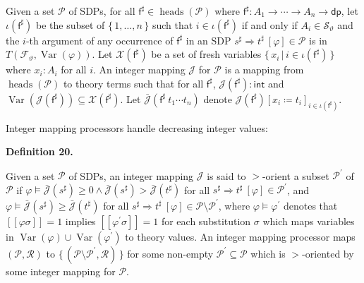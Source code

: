 \documentclass[10pt,a4paper]{amsart}
\providecommand{\coloneq}{\coloneqq}
\begin{document}
Given a set $\mathcal{P}$ of SDPs, for all $\mathsf{f}^{\sharp}\in\operatorname{heads}(\mathcal{P})$ where $\mathsf{f}^{\sharp}:{A}_{1}\rightarrow\cdots\rightarrow{A}_{n}\rightarrow\mathsf{dp}$, let $\iota(\mathsf{f}^{\sharp})$ be the subset of $\{\,1,\ldots,n\,\}$ such that $i\in\iota(\mathsf{f}^{\sharp})$ if and only if $A_{i}\in{\mathcal{S}}_{\vartheta}$ and the $i$-th argument of any occurrence of $\mathsf{f}^{\sharp}$ in an SDP ${s^{\sharp}}\Rightarrow{t^{\sharp}}\ [\varphi]\in\mathcal{P}$ is in $T({\mathcal{F}}_{\vartheta},\operatorname{Var}(\varphi))$. Let $\mathcal{X}(\mathsf{f}^{\sharp})$ be a set of fresh variables $\{\,x_{i}\,|\,i\in\iota(\mathsf{f}^{\sharp})\,\}$ where $x_{i}:A_{i}$ for all $i$. An integer mapping $\mathcal{J}$ for $\mathcal{P}$ is a mapping from $\operatorname{heads}(\mathcal{P})$ to theory terms such that for all $\mathsf{f}^{\sharp}$, $\mathcal{J}(\mathsf{f}^{\sharp}):\mathsf{int}$ and $\operatorname{Var}(\mathcal{J}(\mathsf{f}^{\sharp}))\subseteq\mathcal{X}(\mathsf{f}^{\sharp})$. Let $\bar{\mathcal{J}}({\mathsf{f}^{\sharp}}\ {{t}_{1}\cdots{t}_{n}})$ denote $\mathcal{J}(\mathsf{f}^{\sharp})[{x_{i}}\coloneq{t_{i}}]_{i\in\iota(\mathsf{f}^{\sharp})}$.\par
 
 
 
 
Integer mapping processors handle decreasing integer values:\par
 
 
 
\par\medskip\noindent\textbf{Definition 20.}\par
 
 
Given a set $\mathcal{P}$ of SDPs, an integer mapping $\mathcal{J}$ is said to $>$-orient a subset $\mathcal{P}^{\prime}$ of $\mathcal{P}$ if $\varphi\models\bar{\mathcal{J}}(s^{\sharp})\geq 0\wedge\bar{\mathcal{J}}(s^{\sharp})>\bar{\mathcal{J}}(t^{\sharp})$ for all ${s^{\sharp}}\Rightarrow{t^{\sharp}}\ [\varphi]\in\mathcal{P}^{\prime}$, and $\varphi\models\bar{\mathcal{J}}(s^{\sharp})\geq\bar{\mathcal{J}}(t^{\sharp})$ for all ${s^{\sharp}}\Rightarrow{t^{\sharp}}\ [\varphi]\in\mathcal{P}\setminus\mathcal{P}^{\prime}$, where $\varphi\models\varphi^{\prime}$ denotes that $[\![\varphi\sigma]\!]=1$ implies $[\![\varphi^{\prime}\sigma]\!]=1$ for each substitution $\sigma$ which maps variables in $\operatorname{Var}(\varphi)\cup\operatorname{Var}(\varphi^{\prime})$ to theory values. An integer mapping processor maps $(\mathcal{P},\mathcal{R})$ to $\{\,(\mathcal{P}\setminus\mathcal{P}^{\prime},\mathcal{R})\,\}$ for some non-empty $\mathcal{P}^{\prime}\subseteq\mathcal{P}$ which is $>$-oriented by some integer mapping for $\mathcal{P}$.\par
 
\end{document}
